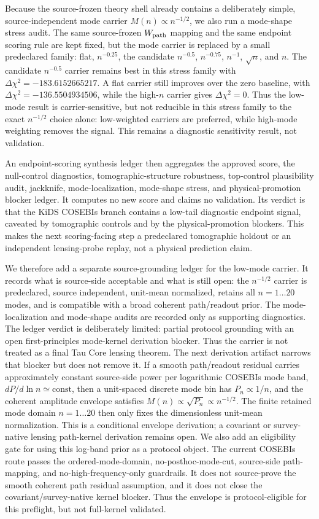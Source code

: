 \documentclass[11pt]{article}
\begin{document}
Because the source-frozen theory shell already contains a deliberately simple,
source-independent mode carrier \(M(n)\propto n^{-1/2}\), we also run a
mode-shape stress audit. The same source-frozen \(W_{\rm path}\) mapping and
the same endpoint scoring rule are kept fixed, but the mode carrier is replaced
by a small predeclared family: flat, \(n^{-0.25}\), the candidate \(n^{-0.5}\),
\(n^{-0.75}\), \(n^{-1}\), \(\sqrt n\), and \(n\). The candidate \(n^{-0.5}\)
carrier remains best in this stress family with
\(\Delta\chi^2=-183.6152665217\). A flat carrier still improves over the zero
baseline, with \(\Delta\chi^2=-136.5504934506\), while the high-\(n\) carrier
gives \(\Delta\chi^2=0\). Thus the low-mode result is carrier-sensitive, but
not reducible in this stress family to the exact \(n^{-1/2}\) choice alone:
low-weighted carriers are preferred, while high-mode weighting removes the
signal. This remains a diagnostic sensitivity result, not validation.

An endpoint-scoring synthesis ledger then aggregates the approved score, the
null-control diagnostics, tomographic-structure robustness, top-control
plausibility audit, jackknife, mode-localization, mode-shape stress, and
physical-promotion blocker ledger. It
computes no new score and claims no validation. Its verdict is that the KiDS
COSEBIs branch contains a low-tail diagnostic endpoint signal, caveated by
tomographic controls and by the physical-promotion blockers. This makes the
next scoring-facing step a predeclared tomographic holdout or an independent
lensing-probe replay, not a physical prediction claim.

We therefore add a separate source-grounding ledger for the low-mode carrier.
It records what is source-side acceptable and what is still open: the
\(n^{-1/2}\) carrier is predeclared, source independent, unit-mean normalized,
retains all \(n=1\ldots20\) modes, and is compatible with a broad coherent
path/readout prior. The mode-localization and mode-shape audits are recorded
only as supporting diagnostics. The ledger verdict is deliberately limited:
partial protocol grounding with an open first-principles mode-kernel derivation
blocker. Thus the carrier is not treated as a final Tau Core lensing theorem.
The next derivation artifact narrows that blocker but does not remove it. If a
smooth path/readout residual carries approximately constant source-side power
per logarithmic COSEBIs mode band, \(dP/d\ln n\simeq\mathrm{const}\), then a
unit-spaced discrete mode bin has \(P_n\propto 1/n\), and the coherent
amplitude envelope satisfies \(M(n)\propto \sqrt{P_n}\propto n^{-1/2}\). The
finite retained mode domain \(n=1\ldots20\) then only fixes the dimensionless
unit-mean normalization. This is a conditional envelope derivation; a covariant
or survey-native lensing path-kernel derivation remains open.
We also add an eligibility gate for using this log-band prior as a protocol
object. The current COSEBIs route passes the ordered-mode-domain,
no-posthoc-mode-cut, source-side path-mapping, and no-high-frequency-only
guardrails. It does not source-prove the smooth coherent path residual
assumption, and it does not close the covariant/survey-native kernel blocker.
Thus the envelope is protocol-eligible for this preflight, but not full-kernel
validated.
\end{document}
